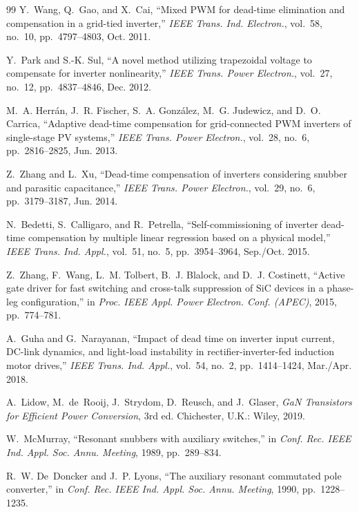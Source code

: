 \documentclass[11pt,a4paper]{article}
\begin{document}
\begin{thebibliography}{99}
Y.~Wang, Q.~Gao, and X.~Cai, ``Mixed PWM for dead-time elimination and compensation in a
grid-tied inverter,'' \emph{IEEE Trans. Ind. Electron.}, vol.~58, no.~10,
pp.~4797--4803, Oct. 2011.

Y.~Park and S.-K. Sul, ``A novel method utilizing trapezoidal voltage to compensate for
inverter nonlinearity,'' \emph{IEEE Trans. Power Electron.}, vol.~27, no.~12,
pp.~4837--4846, Dec. 2012.

M.~A. Herr\'{a}n, J.~R. Fischer, S.~A. Gonz\'{a}lez, M.~G. Judewicz, and D.~O. Carrica,
``Adaptive dead-time compensation for grid-connected PWM inverters of single-stage PV
systems,'' \emph{IEEE Trans. Power Electron.}, vol.~28, no.~6, pp.~2816--2825,
Jun. 2013.

Z.~Zhang and L.~Xu, ``Dead-time compensation of inverters considering snubber and
parasitic capacitance,'' \emph{IEEE Trans. Power Electron.}, vol.~29, no.~6,
pp.~3179--3187, Jun. 2014.

N.~Bedetti, S.~Calligaro, and R.~Petrella, ``Self-commissioning of inverter dead-time
compensation by multiple linear regression based on a physical model,'' \emph{IEEE Trans.
Ind. Appl.}, vol.~51, no.~5, pp.~3954--3964, Sep./Oct. 2015.

Z.~Zhang, F.~Wang, L.~M. Tolbert, B.~J. Blalock, and D.~J. Costinett, ``Active gate
driver for fast switching and cross-talk suppression of SiC devices in a phase-leg
configuration,'' in \emph{Proc. IEEE Appl. Power Electron. Conf. (APEC)}, 2015,
pp.~774--781.

A.~Guha and G.~Narayanan, ``Impact of dead time on inverter input current, DC-link
dynamics, and light-load instability in rectifier-inverter-fed induction motor drives,''
\emph{IEEE Trans. Ind. Appl.}, vol.~54, no.~2, pp.~1414--1424, Mar./Apr. 2018.

A.~Lidow, M.~de~Rooij, J.~Strydom, D.~Reusch, and J.~Glaser, \emph{GaN Transistors for
Efficient Power Conversion}, 3rd ed. Chichester, U.K.: Wiley, 2019.

W.~McMurray, ``Resonant snubbers with auxiliary switches,'' in \emph{Conf. Rec. IEEE
Ind. Appl. Soc. Annu. Meeting}, 1989, pp.~289--834.

R.~W. De~Doncker and J.~P. Lyons, ``The auxiliary resonant commutated pole converter,''
in \emph{Conf. Rec. IEEE Ind. Appl. Soc. Annu. Meeting}, 1990, pp.~1228--1235.


\end{thebibliography}
\end{document}
